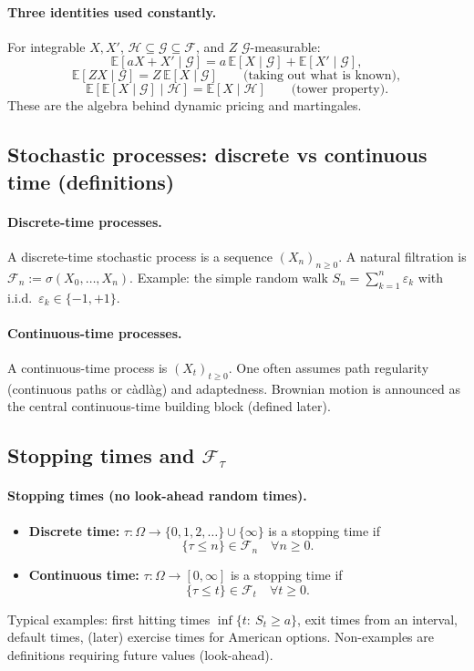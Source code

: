 \documentclass[11pt]{article}
\newcommand{\E}{\mathbb{E}}
\newcommand{\1}{\mathbf{1}}
\theoremstyle{plain}
\theoremstyle{definition}
\theoremstyle{remark}
\begin{document}
\paragraph{Three identities used constantly.}
For integrable $X,X'$, $\mathcal H\subseteq\mathcal G\subseteq\mathcal F$, and $Z$ $\mathcal G$-measurable:
\[
\E[aX+X'\mid\mathcal G]=a\,\E[X\mid\mathcal G]+\E[X'\mid\mathcal G],
\]
\[
\E[ZX\mid\mathcal G]=Z\,\E[X\mid\mathcal G]\qquad\text{(taking out what is known)},
\]
\[
\E\!\left[\E[X\mid\mathcal G]\mid\mathcal H\right]=\E[X\mid\mathcal H]\qquad\text{(tower property)}.
\]
These are the algebra behind dynamic pricing and martingales.

\subsection{Stochastic processes: discrete vs continuous time (definitions)}

\paragraph{Discrete-time processes.}
A discrete-time stochastic process is a sequence $(X_n)_{n\ge 0}$.
A natural filtration is $\mathcal F_n:=\sigma(X_0,\dots,X_n)$.
Example: the simple random walk $S_n=\sum_{k=1}^n \varepsilon_k$ with i.i.d.\ $\varepsilon_k\in\{-1,+1\}$.

\paragraph{Continuous-time processes.}
A continuous-time process is $(X_t)_{t\ge 0}$.
One often assumes path regularity (continuous paths or c\`adl\`ag) and adaptedness.
Brownian motion is announced as the central continuous-time building block (defined later).

\subsection{Stopping times and $\mathcal F_\tau$}

\paragraph{Stopping times (no look-ahead random times).}
\begin{itemize}
\item \textbf{Discrete time:} $\tau:\Omega\to\{0,1,2,\dots\}\cup\{\infty\}$ is a stopping time if
\[
\{\tau\le n\}\in\mathcal F_n\quad \forall n\ge 0.
\]
\item \textbf{Continuous time:} $\tau:\Omega\to[0,\infty]$ is a stopping time if
\[
\{\tau\le t\}\in\mathcal F_t\quad \forall t\ge 0.
\]
\end{itemize}
Typical examples: first hitting times $\inf\{t:\ S_t\ge a\}$, exit times from an interval, default times, (later) exercise times for American options.
Non-examples are definitions requiring future values (look-ahead).
\end{document}
